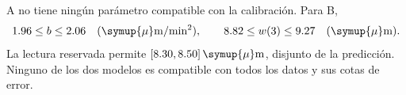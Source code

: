 A no tiene ningún parámetro compatible con la calibración. Para B,
\[
1.96\le b\le2.06\quad(\symup{\mu}\mathrm{m/min^2}),\qquad
8.82\le w(3)\le9.27\quad(\symup{\mu}\mathrm{m}).
\]
La lectura reservada permite \([8.30,8.50]\,\symup{\mu}\mathrm{m}\), disjunto de la predicción. Ninguno de los dos modelos es compatible con todos los datos y sus cotas de error.

